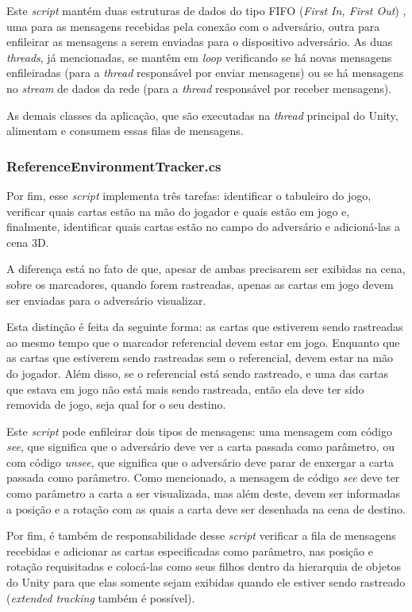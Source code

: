 \documentclass[conference]{IEEEtran}
\begin{document}
Este \textit{script} mantém duas estruturas de dados do tipo FIFO (\textit{First 
In, First Out}) \cite{fifo}, uma para as mensagens recebidas pela conexão com o 
adversário, outra para enfileirar as mensagens a serem enviadas para o 
dispositivo adversário. As duas \textit{threads}, já mencionadas, se mantêm em 
\textit{loop} verificando se há novas mensagens enfileiradas (para a 
\textit{thread} responsável por enviar mensagens) ou se há mensagens no 
\textit{stream} de dados da rede (para a \textit{thread} responsável por receber 
mensagens).

As demais classes da aplicação, que são executadas na \textit{thread} principal 
do Unity, alimentam e consumem essas filas de mensagens.

\subsubsection{ReferenceEnvironmentTracker.cs}
\label{referencetrack}
Por fim, esse \textit{script} implementa três tarefas: identificar o tabuleiro 
do jogo, verificar quais cartas estão na mão do jogador e quais estão em jogo e, 
finalmente, identificar quais cartas estão no campo do adversário e adicioná-las 
a cena 3D.

A diferença está no fato de que, apesar de ambas precisarem ser exibidas na 
cena, sobre os marcadores, quando forem rastreadas, apenas as cartas em jogo 
devem ser enviadas para o adversário visualizar.

Esta distinção é feita da seguinte forma: as cartas que estiverem sendo 
rastreadas ao mesmo tempo que o marcador referencial devem estar em jogo. 
Enquanto que as cartas que estiverem sendo rastreadas sem o referencial, devem 
estar na mão do jogador. Além disso, se o referencial está sendo rastreado, e 
uma das cartas que estava em jogo não está mais sendo rastreada, então ela 
deve ter sido removida de jogo, seja qual for o seu destino.

Este \textit{script} pode enfileirar dois tipos de mensagens: uma mensagem com 
código \textit{see}, que significa que o adversário deve ver a carta passada 
como parâmetro, ou com código \textit{unsee}, que significa que o adversário 
deve parar de enxergar a carta passada como parâmetro. Como mencionado, 
a mensagem de código \textit{see} deve ter como parâmetro a carta a ser 
visualizada, mas além deste, devem ser informadas a posição e a rotação com as 
quais a carta deve ser desenhada na cena de destino.

Por fim, é também de responsabilidade desse \textit{script} verificar a fila de 
mensagens recebidas e adicionar as cartas especificadas como parâmetro, nas 
posição e rotação requisitadas e colocá-las como seus filhos dentro da 
hierarquia de objetos do Unity para que elas somente sejam exibidas quando ele 
estiver sendo rastreado (\textit{extended tracking} também é possível).
\end{document}
